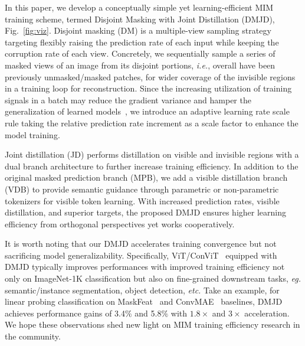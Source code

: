 \documentclass[lettersize,journal]{IEEEtran}
\begin{document}
In this paper, we develop a conceptually simple yet learning-efficient MIM training scheme, termed Disjoint Masking with
Joint Distillation (DMJD), Fig.~\ref{fig:viz}. 
Disjoint masking (DM) is a multiple-view sampling strategy targeting flexibly raising the prediction rate of each input while keeping the corruption rate of each view. 
Concretely, we sequentially sample a series of masked views of an image from its disjoint portions, \textit{i.e.}, overall have been previously unmasked/masked patches, for wider coverage of the invisible regions in a training loop for reconstruction.
Since the increasing utilization of training signals in a batch may reduce the gradient variance and hamper the generalization of learned models~\cite{2016arXiv160904836S, Hoffer2020AugmentYB, 2021arXiv210513343F}, we introduce an adaptive learning rate scale rule taking the relative prediction rate increment as a scale factor to enhance the model training. 

Joint distillation (JD) performs distillation on visible and invisible regions with a dual branch architecture to further increase training efficiency.
In addition to the original masked prediction branch (MPB), we add a visible distillation branch (VDB) to provide semantic guidance through parametric or non-parametric tokenizers for visible token learning.
With increased prediction rates, visible distillation, and superior targets, the proposed DMJD ensures higher learning efficiency from orthogonal perspectives yet works cooperatively.

It is worth noting that our DMJD accelerates training convergence but not sacrificing model generalizability. 
Specifically, ViT/ConViT~\cite{2021arXiv210313915S, 2022arXiv220503892G} equipped with DMJD typically improves performances with improved training efficiency not only on ImageNet-1K classification but also on fine-grained downstream tasks, \textit{eg.} semantic/instance segmentation, object detection, \textit{etc.}
Take an example, for linear probing classification on MaskFeat~\cite{2021arXiv211209133W} and ConvMAE~\cite{2022arXiv220503892G} baselines, DMJD achieves performance gains of 3.4$\%$ and 5.8$\%$ with $1.8 \times$ and $3 \times$ acceleration.
We hope these observations shed new light on MIM training efficiency research in the community.
\end{document}
